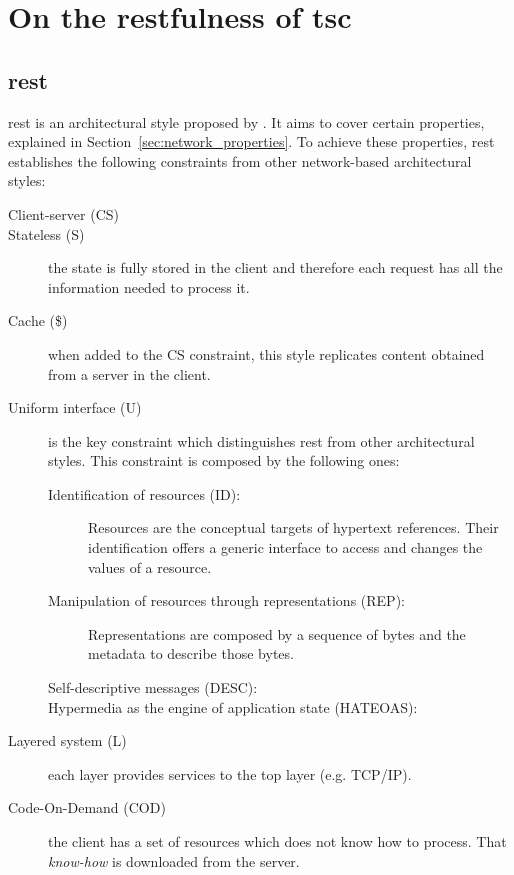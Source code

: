 
\section{On the \acs{rest}fulness of \acs{tsc}}

\subsection{\acl{rest}}
\label{sec:rest}

\acf{rest} is an architectural style proposed by \citet{fielding_architectural_2000}.
It aims to cover certain properties, explained in Section~\ref{sec:network_properties}.
To achieve these properties, \ac{rest} establishes the following constraints from other network-based architectural styles:
\begin{description}
 \item[Client-server (CS)]
 \item[Stateless (S)] the state is fully stored in the client and therefore each request has all the information needed to process it.
 \item[Cache (\$)] when added to the CS constraint, this style replicates content obtained from a server in the client.
 \item[Uniform interface (U)] is the key constraint which distinguishes \ac{rest} from other architectural styles.
                   This constraint is composed by the following ones:
    \begin{description}
	\item[Identification of resources (ID):]
		    Resources are the conceptual targets of hypertext references.
		    Their identification offers a generic interface to access and changes the values of a resource.
	\item[Manipulation of resources through representations (REP):]
		    Representations are composed by a sequence of bytes and the metadata to describe those bytes.
	\item[Self-descriptive messages (DESC):] %
	\item[Hypermedia as the engine of application state (HATEOAS):] %
    \end{description}
 \item[Layered system (L)] each layer provides services to the top layer (e.g. TCP/IP). %
 \item[Code-On-Demand (COD)] the client has a set of resources which does not know how to process.
       That \emph{know-how} is downloaded from the server.
\end{description}


